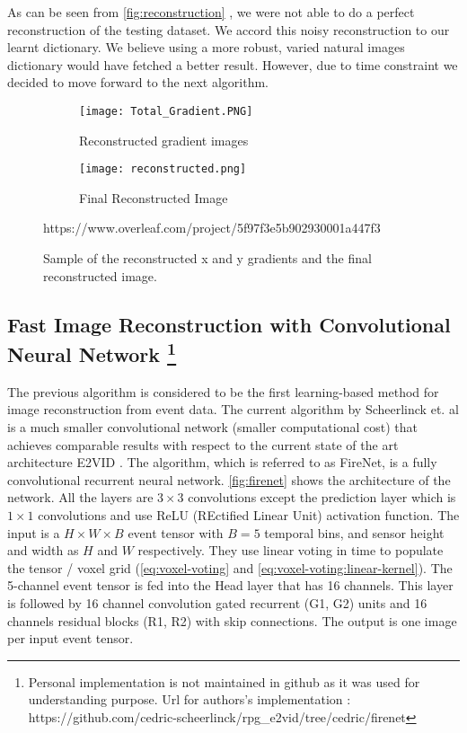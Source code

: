 \documentclass[10pt]{report}
\begin{document}
As can be seen from \autoref{fig:reconstruction} , we were not able to do a perfect reconstruction of the testing dataset. We accord this noisy reconstruction to our learnt dictionary. We believe using a more robust, varied natural images dictionary would have fetched a better result. However, due to time constraint we decided to move forward to the next algorithm. 
\begin{figure}
\centering
\begin{subfigure}{.45\linewidth}
  \centering
  \texttt{[image: Total\_Gradient.PNG]}
  \caption{Reconstructed gradient images}
  \label{fig:gradient images}
\end{subfigure}\;\;
\begin{subfigure}{.45\linewidth}
  \centering
  \texttt{[image: reconstructed.png]}
  \caption{Final Reconstructed Image}
  \label{fig:reconstructed}
\end{subfigure}
\caption{Sample of the reconstructed x and y gradients and the final reconstructed image.}
\label{fig:reconstruction}
https://www.overleaf.com/project/5f97f3e5b902930001a447f3\end{figure}

\subsection[Fast Image Reconstruction with Convolutional Neural Network]{Fast Image Reconstruction with Convolutional Neural Network \footnote{ Personal implementation is not maintained in github as it was used for understanding purpose. Url for authors's implementation : https://github.com/cedric-scheerlinck/rpg\_e2vid/tree/cedric/firenet }}
\label{sec:firenet}
The previous algorithm \cite{Barua16wacv} is considered to be the first learning-based method for image reconstruction from event data. 
The current algorithm by Scheerlinck et. al \cite{Scheerlinck20wacv} is a much smaller convolutional network (smaller computational cost) that achieves comparable results with respect to the current state of the art architecture E2VID \cite{Rebecq19pami}.
The algorithm, which is referred to as FireNet, is a fully convolutional recurrent neural network. 
\autoref{fig:firenet} shows the architecture of the network. 
All the layers are $3\times 3$ convolutions except the prediction layer which is $1 \times 1$ convolutions and use ReLU (REctified Linear Unit) activation function. 
The input is a $H \times W \times B$ event tensor with $B = 5$ temporal bins, and sensor height and width as $H$ and $W$ respectively. 
They use linear voting in time to populate the tensor / voxel grid (\autoref{eq:voxel-voting} and \autoref{eq:voxel-voting:linear-kernel}). 
The 5-channel event tensor is fed into the Head layer that has 16 channels. 
This layer is followed by 16 channel convolution gated recurrent (G1, G2) units and 16 channels residual blocks (R1, R2) with skip connections.  
The output is one image per input event tensor.
\end{document}
